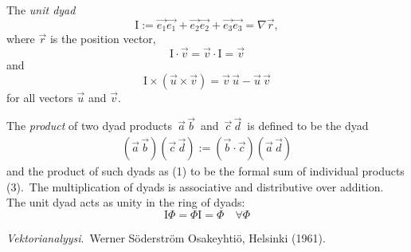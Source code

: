 \documentclass[12pt]{article}
\theoremstyle{definition}
\begin{document}
The {\em unit dyad}
$$\mbox{I} := \vec{e_1}\vec{e_1}\!+\!\vec{e_2}\vec{e_2}\!+\!\vec{e_3}\vec{e_3} =  \nabla\vec{r},$$
where $\vec{r}$ is the position vector, 
$$\mbox{I}\!\cdot\!\vec{v} = \vec{v}\!\cdot\!\mbox{I} = \vec{v}$$
and 
$$\mbox{I}\!\times\!(\vec{u}\!\times\!\vec{v}) = \vec{v}\,\vec{u}-\vec{u}\,\vec{v}$$
for all vectors $\vec{u}$ and $\vec{v}$.

The {\em product} of two dyad products\, $\vec{a}\,\vec{b}$\, and\, 
$\vec{c}\,\vec{d}$\, is defined to be the dyad
\begin{align}
(\vec{a}\,\vec{b})(\vec{c}\,\vec{d}) := 
  (\vec{b}\!\cdot\!\vec{c})(\vec{a}\,\vec{d})
\end{align}
and the product of such dyads as (1) to be the formal sum of individual products (3).\, The multiplication of dyads is associative and distributive over addition.\, The unit dyad acts as unity in the ring of dyads:
$$\mbox{I}\Phi = \Phi\mbox{I} = \Phi \quad \forall \Phi$$


\begin{thebibliography}{9}
 {\em Vektorianalyysi}. \,Werner S\"oderstr\"om Osakeyhti\"o, Helsinki (1961).
\end{thebibliography}
\end{document}

